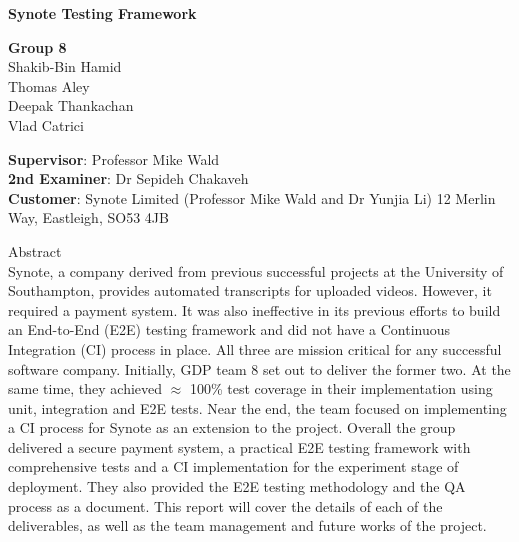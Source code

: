 \thispagestyle{plain}


\begin{center}
    
    {\selectfont

    \textbf{Synote Testing Framework}\\
        
    \vspace{1cm}
    
    \textbf{Group 8} \\
	Shakib-Bin Hamid \\ Thomas Aley \\ Deepak Thankachan \\ Vlad Catrici    
    
    \vspace{2cm}
	}    
\end{center}


{\selectfont
\textbf{Supervisor}: Professor Mike Wald\\
\textbf{2nd Examiner}: Dr Sepideh Chakaveh\\
\textbf{Customer}: Synote Limited (Professor Mike Wald and Dr Yunjia Li) 12 Merlin Way, Eastleigh, SO53 4JB
}

\vspace{1cm}

\begin{framed}

{\selectfont
Abstract\\

Synote, a company derived from previous successful projects at the University of Southampton, provides automated transcripts for uploaded videos. However, it required a payment system. It was also ineffective in its previous efforts to build an End-to-End (E2E) testing framework and did not have a Continuous Integration (CI) process in place. All three are mission critical for any successful software company. Initially, GDP team 8 set out to deliver the former two. At the same time, they achieved $\approx$ 100\% test coverage in their implementation using unit, integration and E2E tests. Near the end, the team focused on implementing a CI process for Synote as an extension to the project. Overall the group delivered a secure payment system, a practical E2E testing framework with comprehensive tests and a CI implementation for the experiment stage of deployment. They also provided the E2E testing methodology and the QA process as a document. This report will cover the details of each of the deliverables, as well as the team management and future works of the project.
}
\end{framed}

\restoregeometry

